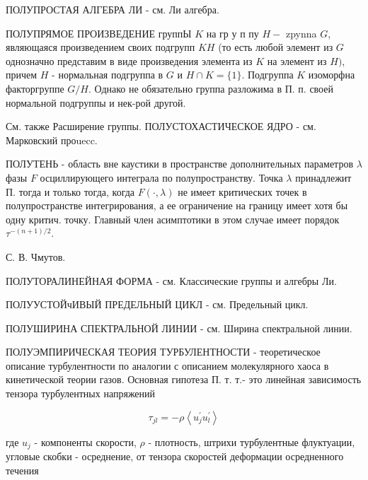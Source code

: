 \documentclass[10pt]{article}
\begin{document}
ПОЛУПРОСТАЯ АЛГЕБРА ЛИ - см. Ли алгебра.



ПОЛУПРЯМОЕ ПРОИЗВЕДЕНИЕ группЫ $K$ на гр у п пу $H-$ zpynna $G$, являющаяся произведением своих подгрупп $K H$ (то есть любой элемент из $G$ однозначно представим в виде произведения элемента из $K$ на элемент из $H)$, причем $H$ - нормальная подгруппа в $G$ и $H \cap K=\{1\}$. Подгруппа $K$ изоморфна факторгруппе $G / H$. Однако не обязательно группа разложима в П. п. своей нормальной подгруппы и нек-рой другой.



См. также Расширение группы. ПОЛУСТОХАСТИЧЕСКОЕ ЯДРО - см. Марковский проuecc.



ПОЛУТЕНЬ - область вне каустики в пространстве дополнительных параметров $\lambda$ фазы $F$ осциллирующего интеграла по полупространству. Точка $\lambda$ принадлежит П. тогда и только тогда, когда $F(\cdot, \lambda)$ не имеет критических точек в полупространстве интегрирования, а ее ограничение на границу имеет хотя бы одну критич. точку. Главный член асимптотики в этом случае имеет порядок $\tau^{-(n+1) / 2}$.



С. В. Чмутов.



ПОЛУТОРАЛИНЕЙНАЯ ФОРМА - см. Классические группы и алгебры Ли.



ПОЛУУСТОЙчИВЫЙ ПРЕДЕЛЬНЫЙ ЦИКЛ - см. Предельный цикл.



ПОЛУШИРИНА СПЕКТРАЛЬНОЙ ЛИНИИ - см. Ширина спектральной линии.



ПОЛУЭМПИРИЧЕСКАЯ ТЕОРИЯ ТУРБУЛЕНТНОСТИ - теоретическое описание турбулентности по аналогии с описанием молекулярного хаоса в кинетической теории газов. Основная гипотеза П. т. т.- это линейная зависимость тензора турбулентных напряжений



\[

\tau_{j l}=-\rho\left\langle u_{j}^{\prime} u_{l}^{\prime}\right\rangle

\]



где $u_{j}$ - компоненты скорости, $\rho$ - плотность, штрихи турбулентные флуктуации, угловые скобки - осреднение, от тензора скоростей деформации осредненного течения
\end{document}

